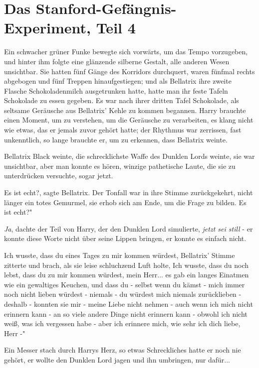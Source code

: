 \chapter{Das Stanford-Gefängnis-Experiment, Teil 4}

Ein schwacher grüner Funke bewegte sich vorwärts, um das Tempo vorzugeben, und
hinter ihm folgte eine glänzende silberne Gestalt, alle anderen Wesen
unsichtbar. Sie hatten fünf Gänge des Korridors durchquert, waren fünfmal rechts
abgebogen und fünf Treppen hinaufgestiegen; und als Bellatrix ihre zweite
Flasche Schokoladenmilch ausgetrunken hatte, hatte man ihr feste Tafeln
Schokolade zu essen gegeben. Es war nach ihrer dritten Tafel Schokolade, als
seltsame Geräusche aus Bellatrix' Kehle zu kommen begannen. Harry brauchte einen
Moment, um zu verstehen, um die Geräusche zu verarbeiten, es klang nicht wie
etwas, das er jemals zuvor gehört hatte; der Rhythmus war zerrissen, fast
unkenntlich, so lange brauchte er, um zu erkennen, dass Bellatrix weinte.

Bellatrix Black weinte, die schrecklichste Waffe des Dunklen Lords weinte, sie
war unsichtbar, aber man konnte es hören, winzige pathetische Laute, die sie zu
unterdrücken versuchte, sogar jetzt.

\glqq Es ist echt?\grqq{}, sagte Bellatrix. Der Tonfall war in ihre Stimme
zurückgekehrt, nicht länger ein totes Gemurmel, sie erhob sich am Ende, um die
Frage zu bilden. \glqq Es ist echt?"

\emph{Ja}, dachte der Teil von Harry, der den Dunklen Lord simulierte,
\emph{jetzt sei still} - er konnte diese Worte nicht über seine Lippen bringen,
er konnte es einfach nicht.

\glqq Ich wusste, dass du eines Tages zu mir kommen würdest\grqq{}, Bellatrix'
Stimme zitterte und brach, als sie leise schluchzend Luft holte, \glqq Ich
wusste, dass du noch lebst, dass du zu mir kommen würdest, mein Herr... \glqq es
gab ein langes Einatmen wie ein gewaltiges Keuchen, \glqq und dass du - selbst
wenn du kämst - mich immer noch nicht lieben würdest - niemals - du würdest mich
niemals zurücklieben - deshalb - konnten sie mir - meine Liebe nicht nehmen -
auch wenn ich mich nicht erinnern kann - an so viele andere Dinge nicht erinnern
kann - obwohl ich nicht weiß, was ich vergessen habe - aber ich erinnere mich,
wie sehr ich dich liebe, Herr -"

Ein Messer stach durch Harrys Herz, so etwas Schreckliches hatte er noch nie
gehört, er wollte den Dunklen Lord jagen und ihn umbringen, nur dafür...

